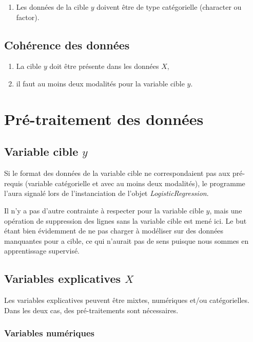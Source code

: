 \documentclass[10pt,french]{report}
\begin{document}
	\begin{enumerate}
		\item Les données de la cible $y$ doivent être de type catégorielle (character ou factor).
	\end{enumerate}

	\subsection{Cohérence des données}

	\begin{enumerate}
		\item La cible $y$ doit être présente dans les données $X$,
		\item il faut au moins deux modalités pour la variable cible $y$.
	\end{enumerate}

	\section{Pré-traitement des données}

	\subsection{Variable cible $y$}

	Si le format des données de la variable cible ne correspondaient pas aux pré-requis (variable catégorielle et avec au moins deux modalités), le programme l'aura signalé lors de l'instanciation de l'objet \textit{LogisticRegression}.

	Il n'y a pas d'autre contrainte à respecter pour la variable cible $y$, mais une opération de suppression des lignes sans la variable cible est mené ici. Le but étant bien évidemment de ne pas charger à modéliser sur des données manquantes pour a cible, ce qui n'aurait pas de sens puisque nous sommes en apprentissage supervisé.

	\subsection{Variables explicatives $X$}

	Les variables explicatives peuvent être mixtes, numériques et/ou catégorielles. Dans les deux cas, des pré-traitements sont nécessaires.

	\subsubsection{Variables numériques}
\end{document}

